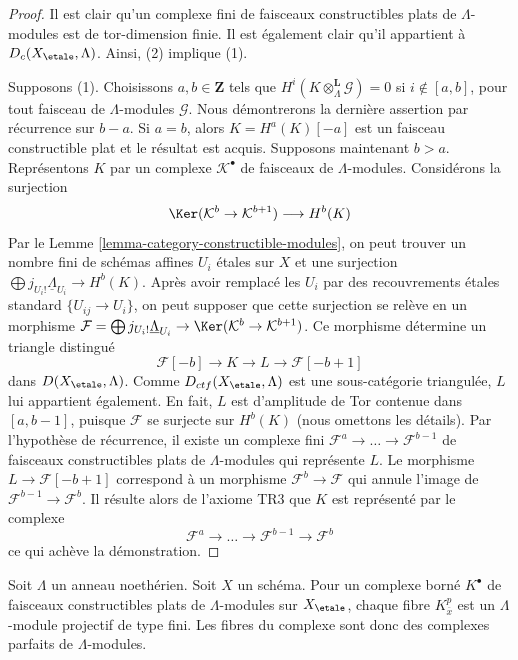 \begin{proof}
Il est clair qu'un complexe fini de faisceaux constructibles
plats de $\Lambda$-modules est de tor-dimension finie.
Il est également clair qu'il appartient à $D_c(X_\etale, \Lambda)$.
Ainsi, (2) implique (1).

\medskip\noindent
Supposons (1). Choisissons $a, b \in \mathbf{Z}$ tels que
$H^i(K \otimes_\Lambda^\mathbf{L} \mathcal{G}) = 0$ si
$i \not \in [a, b]$, pour tout faisceau de $\Lambda$-modules $\mathcal{G}$.
Nous démontrerons la dernière assertion par récurrence sur $b - a$. Si
$a = b$, alors $K = H^a(K)[-a]$ est un faisceau constructible plat
et le résultat est acquis. Supposons maintenant $b > a$. Représentons $K$
par un complexe $\mathcal{K}^\bullet$ de faisceaux de $\Lambda$-modules.
Considérons la surjection
$$
\Ker(\mathcal{K}^b \to \mathcal{K}^{b + 1})
\longrightarrow
H^b(K)
$$
Par le Lemme \ref{lemma-category-constructible-modules},
on peut trouver un nombre fini de schémas affines $U_i$ étales sur $X$ et une
surjection $\bigoplus j_{U_i!}\underline{\Lambda}_{U_i} \to H^b(K)$.
Après avoir remplacé les $U_i$ par des recouvrements étales standard $\{U_{ij} \to U_i\}$,
on peut supposer que cette surjection se relève en un morphisme
$\mathcal{F} = \bigoplus j_{U_i!}\underline{\Lambda}_{U_i} \to
\Ker(\mathcal{K}^b \to \mathcal{K}^{b + 1})$.
Ce morphisme détermine un triangle distingué
$$
\mathcal{F}[-b] \to K \to L \to \mathcal{F}[-b + 1]
$$
dans $D(X_\etale, \Lambda)$. Comme $D_{ctf}(X_\etale, \Lambda)$ est une
sous-catégorie triangulée, $L$ lui appartient également. En fait, $L$ est
d'amplitude de Tor contenue dans $[a, b - 1]$, puisque $\mathcal{F}$ se surjecte sur
$H^b(K)$ (nous omettons les détails). Par l'hypothèse de récurrence, il existe
un complexe fini $\mathcal{F}^a \to \ldots \to \mathcal{F}^{b - 1}$
de faisceaux constructibles plats de $\Lambda$-modules qui représente $L$.
Le morphisme $L \to \mathcal{F}[-b + 1]$ correspond à un morphisme
$\mathcal{F}^b \to \mathcal{F}$ qui annule l'image
de $\mathcal{F}^{b - 1} \to \mathcal{F}^b$. Il résulte alors
de l'axiome TR3 que $K$ est représenté par le complexe
$$
\mathcal{F}^a \to \ldots \to \mathcal{F}^{b - 1} \to \mathcal{F}^b
$$
ce qui achève la démonstration.
\end{proof}

\begin{remark}
\label{remark-projective-each-degree}
Soit $\Lambda$ un anneau noethérien. Soit $X$ un schéma.
Pour un complexe borné $K^\bullet$ de faisceaux constructibles plats de $\Lambda$-modules
sur $X_\etale$,
chaque fibre $K^p_{\overline{x}}$ est un $\Lambda$-module projectif de type fini.
Les fibres du complexe sont donc des complexes parfaits de $\Lambda$-modules.
\end{remark}

